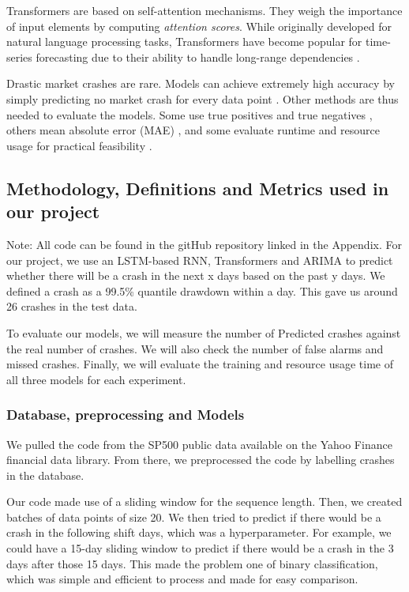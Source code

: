 \documentclass[12pt, letterpaper]{article}
\begin{document}
\begin{multicols}{2}
Transformers are based on self-attention mechanisms. They weigh the importance of input elements by computing \textit{attention scores}. While originally developed for natural language processing tasks, Transformers have become popular for time-series forecasting due to their ability to handle long-range dependencies \cite{vaswani2017attention}.

Drastic market crashes are rare. Models can achieve extremely high accuracy by simply predicting no market crash for every data point \cite{market_infrequent}. Other methods are thus needed to evaluate the models. Some use true positives and true negatives \cite{true_positive}, others mean absolute error (MAE) \cite{hyndman2018}, and some evaluate runtime and resource usage for practical feasibility \cite{lim2021temporal}.
\end{multicols}






\subsection*{Methodology, Definitions and Metrics used in our project}
Note: All code can be found in the gitHub repository linked in the Appendix.
For our project, we use an LSTM-based RNN, Transformers and ARIMA to predict whether there will be a crash in the next x days based on the past y days. We defined a crash as a 99.5\% quantile drawdown within a day. This gave us around 26 crashes in the test data.

To evaluate our models, we will measure the number of Predicted crashes against the real number of crashes. We will also check the number of false alarms and missed crashes. Finally, we will evaluate the training and resource usage time of all three models for each experiment.

\subsubsection*{Database, preprocessing and Models}

We pulled the code from the SP500 public data available on the Yahoo Finance financial data library. From there, we preprocessed the code by labelling crashes in the database.

Our code made use of a sliding window for the sequence length. Then, we created batches of data points of size 20. We then tried to predict if there would be a crash in the following shift days, which was a hyperparameter. For example, we could have a 15-day sliding window to predict if there would be a crash in the 3 days after those 15 days. 
This made the problem one of binary classification, which was simple and efficient to process and made for easy comparison.
\end{document}
